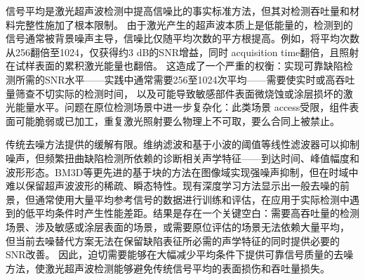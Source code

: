 信号平均是激光超声波检测中提高信噪比的事实标准方法，但其对检测吞吐量和材料完整性施加了根本限制。
由于激光产生的超声波本质上是低能量的，检测到的信号通常被背景噪声主导，信噪比仅随平均次数的平方根提高\cite{liu2022deep}。例如，将平均次数从256翻倍至1024，仅获得约3 dB的SNR增益，同时 acquisition time翻倍，且照射在试样表面的累积激光能量也翻倍。
这造成了一个严重的权衡：实现可靠缺陷检测所需的SNR水平——实践中通常需要256至1024次平均——需要使实时或高吞吐量筛查不切实际的检测时间，
以及可能导致敏感部件表面微烧蚀或涂层损坏的激光能量水平\cite{yang2023unsupervised}。问题在原位检测场景中进一步复杂化：此类场景 access受限，组件表面可能脆弱或已加工，重复激光照射要么物理上不可取，要么合同上被禁止。

传统去噪方法提供的缓解有限。维纳滤波和基于小波的阈值等线性滤波器可以抑制噪声，但频繁扭曲缺陷检测所依赖的诊断相关声学特征——到达时间、峰值幅度和波形形态\cite{chen2019wavelet}。BM3D等更先进的基于块的方法在图像域实现强噪声抑制，但在时域中难以保留超声波波形的稀疏、瞬态特性\cite{dabov2007bm3d}。现有深度学习方法显示出一般去噪的前景\cite{zhang2017denoising}，但通常使用大量平均参考信号的数据进行训练和评估，在应用于实际检测中遇到的低平均条件时产生性能差距\cite{liu2022deep}。结果是存在一个关键空白：需要高吞吐量的检测场景、涉及敏感或涂层表面的场景，或需要原位评估的场景无法依赖大量平均，
但当前去噪替代方案无法在保留缺陷表征所必需的声学特征的同时提供必要的SNR改善。
因此，迫切需要能够在大幅减少平均条件下提供可靠信号质量的去噪方法，使激光超声波检测能够避免传统信号平均的表面损伤和吞吐量损失。